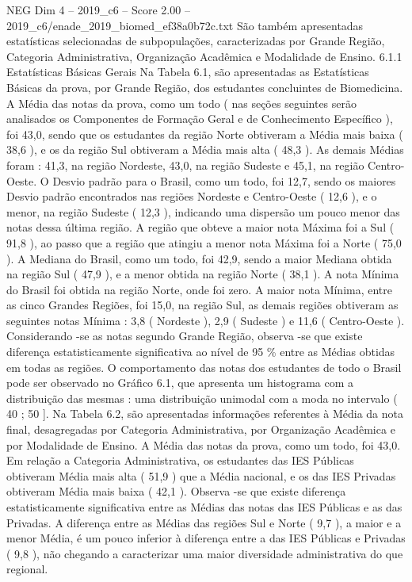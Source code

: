 \begin{textsample}{NEG Dim 4 – 2019\_c6 – Score 2.00 – 2019\_c6/enade\_2019\_biomed\_ef38a0b72c.txt}
São também apresentadas estatísticas selecionadas de subpopulações, caracterizadas por Grande Região, Categoria Administrativa, Organização Acadêmica e Modalidade de Ensino. 6.1.1 Estatísticas Básicas Gerais Na Tabela 6.1, são apresentadas as Estatísticas Básicas da prova, por Grande Região, dos estudantes concluintes de Biomedicina.
A Média das notas da prova, como um todo ( nas seções seguintes serão analisados os Componentes de Formação Geral e de Conhecimento Específico ), foi 43,0, sendo que os estudantes da região Norte obtiveram a Média mais baixa ( 38,6 ), e os da região Sul obtiveram a Média mais alta ( 48,3 ).
As demais Médias foram : 41,3, na região Nordeste, 43,0, na região Sudeste e 45,1, na região Centro-Oeste.
O Desvio padrão para o Brasil, como um todo, foi 12,7, sendo os maiores Desvio padrão encontrados nas regiões Nordeste e Centro-Oeste ( 12,6 ), e o menor, na região Sudeste ( 12,3 ), indicando uma dispersão um pouco menor das notas dessa última região.
A região que obteve a maior nota Máxima foi a Sul ( 91,8 ), ao passo que a região que atingiu a menor nota Máxima foi a Norte ( 75,0 ).
A Mediana do Brasil, como um todo, foi 42,9, sendo a maior Mediana obtida na região Sul ( 47,9 ), e a menor obtida na região Norte ( 38,1 ).
A nota Mínima do Brasil foi obtida na região Norte, onde foi zero.
A maior nota Mínima, entre as cinco Grandes Regiões, foi 15,0, na região Sul, as demais regiões obtiveram as seguintes notas Mínima : 3,8 ( Nordeste ), 2,9 ( Sudeste ) e 11,6 ( Centro-Oeste ).
Considerando -se as notas segundo Grande Região, observa -se que existe diferença estatisticamente significativa ao nível de 95 \% entre as Médias obtidas em todas as regiões.
O comportamento das notas dos estudantes de todo o Brasil pode ser observado no Gráfico 6.1, que apresenta um histograma com a distribuição das mesmas : uma distribuição unimodal com a moda no intervalo ( 40 ; 50 ].
Na Tabela 6.2, são apresentadas informações referentes à Média da nota final, desagregadas por Categoria Administrativa, por Organização Acadêmica e por Modalidade de Ensino.
A Média das notas da prova, como um todo, foi 43,0.
Em relação a Categoria Administrativa, os estudantes das IES Públicas obtiveram Média mais alta ( 51,9 ) que a Média nacional, e os das IES Privadas obtiveram Média mais baixa ( 42,1 ).
Observa -se que existe diferença estatisticamente significativa entre as Médias das notas das IES Públicas e as das Privadas.
A diferença entre as Médias das regiões Sul e Norte ( 9,7 ), a maior e a menor Média, é um pouco inferior à diferença entre a das IES Públicas e Privadas ( 9,8 ), não chegando a caracterizar uma maior diversidade administrativa do que regional.

\end{textsample}
